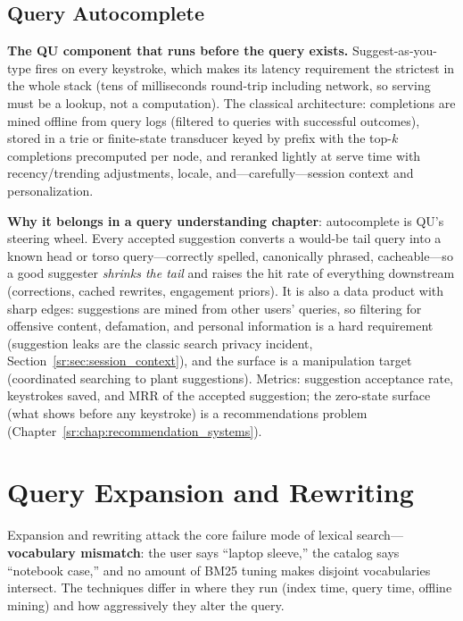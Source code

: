 \subsection{Query Autocomplete}
\label{sr:sec:query_autocomplete}

\textbf{The QU component that runs before the query exists.} Suggest-as-you-type fires on every keystroke, which makes its latency requirement the strictest in the whole stack (tens of milliseconds round-trip including network, so serving must be a lookup, not a computation). The classical architecture: completions are mined offline from query logs (filtered to queries with successful outcomes), stored in a trie or finite-state transducer keyed by prefix with the top-$k$ completions precomputed per node, and reranked lightly at serve time with recency/trending adjustments, locale, and---carefully---session context and personalization.

\textbf{Why it belongs in a query understanding chapter}: autocomplete is QU's steering wheel. Every accepted suggestion converts a would-be tail query into a known head or torso query---correctly spelled, canonically phrased, cacheable---so a good suggester \textit{shrinks the tail} and raises the hit rate of everything downstream (corrections, cached rewrites, engagement priors). It is also a data product with sharp edges: suggestions are mined from other users' queries, so filtering for offensive content, defamation, and personal information is a hard requirement (suggestion leaks are the classic search privacy incident, Section~\ref{sr:sec:session_context}), and the surface is a manipulation target (coordinated searching to plant suggestions). Metrics: suggestion acceptance rate, keystrokes saved, and MRR of the accepted suggestion; the zero-state surface (what shows before any keystroke) is a recommendations problem (Chapter~\ref{sr:chap:recommendation_systems}).

\section{Query Expansion and Rewriting}
\label{sr:sec:query_rewriting}

Expansion and rewriting attack the core failure mode of lexical search---\textbf{vocabulary mismatch}: the user says ``laptop sleeve,'' the catalog says ``notebook case,'' and no amount of BM25 tuning makes disjoint vocabularies intersect. The techniques differ in where they run (index time, query time, offline mining) and how aggressively they alter the query.

